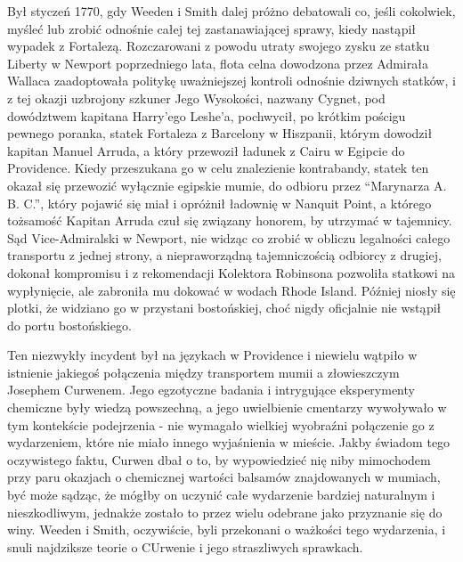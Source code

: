 Był styczeń 1770, gdy Weeden i Smith dalej próżno debatowali co, jeśli cokolwiek, myśleć lub zrobić odnośnie całej tej zastanawiającej sprawy, kiedy nastąpił wypadek z Fortalezą. Rozczarowani z powodu utraty swojego zysku ze statku Liberty w Newport poprzedniego lata, flota celna dowodzona przez Admirała Wallaca zaadoptowała politykę uważniejszej kontroli odnośnie dziwnych statków, i z tej okazji uzbrojony szkuner Jego Wysokości, nazwany Cygnet, pod dowództwem kapitana Harry'ego Leshe'a, pochwycił, po krótkim pościgu pewnego poranka, statek Fortaleza z Barcelony w Hiszpanii, którym dowodził kapitan Manuel Arruda, a który przewoził ładunek z Cairu w Egipcie do Providence. Kiedy przeszukana go w celu znalezienie kontrabandy, statek ten okazał się przewozić wyłącznie egipskie mumie, do odbioru przez ``Marynarza A. B. C.'', który pojawić się miał i opróżnił ładownię w Nanquit Point, a którego tożsamość Kapitan Arruda czuł się związany honorem, by utrzymać w tajemnicy. Sąd Vice-Admiralski w Newport, nie widząc co zrobić w obliczu legalności całego transportu z jednej strony, a niepraworządną tajemniczością odbiorcy z drugiej, dokonał kompromisu i z rekomendacji Kolektora Robinsona pozwoliła statkowi na wypłynięcie, ale zabroniła mu dokować w wodach Rhode Island. Później niosły się plotki, że widziano go w przystani bostońskiej, choć nigdy oficjalnie nie wstąpił do portu bostońskiego.  

Ten niezwykły incydent był na językach w Providence i niewielu wątpiło w istnienie jakiegoś połączenia między transportem mumii a złowieszczym Josephem Curwenem. Jego egzotyczne badania i intrygujące eksperymenty chemiczne były wiedzą powszechną, a jego uwielbienie cmentarzy wywoływało w tym kontekście podejrzenia - nie wymagało wielkiej wyobraźni połączenie go z wydarzeniem, które nie miało innego wyjaśnienia w mieście. Jakby świadom tego oczywistego faktu, Curwen dbał o to, by wypowiedzieć nię niby mimochodem przy paru okazjach o chemicznej wartości balsamów znajdowanych w mumiach, być może sądząc, że mógłby on uczynić całe wydarzenie bardziej naturalnym i nieszkodliwym, jednakże zostało to przez wielu odebrane jako przyznanie się do winy. Weeden i Smith, oczywiście, byli przekonani o ważkości tego wydarzenia, i snuli najdziksze teorie o CUrwenie i jego straszliwych sprawkach.

